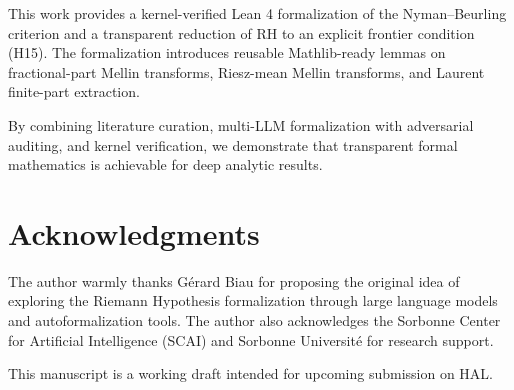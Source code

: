 \documentclass[11pt,a4paper]{article}
\theoremstyle{plain}
\theoremstyle{definition}
\theoremstyle{remark}
\begin{document}
This work provides a kernel-verified Lean 4 formalization of the Nyman--Beurling criterion and a transparent reduction of RH to an explicit frontier condition (H15). The formalization introduces reusable Mathlib-ready lemmas on fractional-part Mellin transforms, Riesz-mean Mellin transforms, and Laurent finite-part extraction.

By combining literature curation, multi-LLM formalization with adversarial auditing, and kernel verification, we demonstrate that transparent formal mathematics is achievable for deep analytic results.

\section*{Acknowledgments}

The author warmly thanks G\'erard Biau for proposing the original idea of exploring the Riemann Hypothesis formalization through large language models and autoformalization tools. The author also acknowledges the Sorbonne Center for Artificial Intelligence (SCAI) and Sorbonne Universit\'e for research support.

This manuscript is a working draft intended for upcoming submission on HAL.
\end{document}

